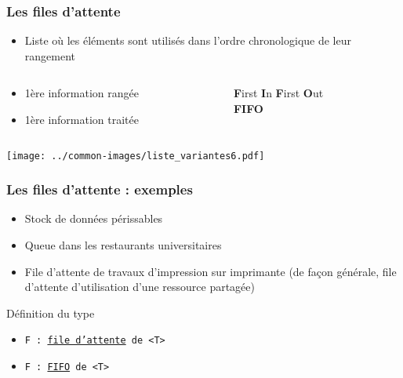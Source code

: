\documentclass[table,handout,tikz,12pt,svgnames]{beamer}
\begin{document}
\begin{frame}[fragile=singleslide]
	\frametitle{Les files d'attente}
	\begin{block}{}
		\begin{itemize}
			\item  Liste où les éléments sont utilisés dans l'ordre chronologique de leur rangement
		\end{itemize}
	\end{block}
		\begin{columns}[c]
			\hspace{-0.5cm}
			\begin{column}{0.7\textwidth}
				\begin{itemize}
					\item 1ère information rangée
					\item 1ère information traitée
				\end{itemize}
			\end{column}
			\hspace{-1.3cm}
			\vrule{}
			\hspace{0.3cm}
			\begin{column}{0.38\textwidth}
				\begin{center}
					\textbf{F}irst \textbf{I}n \textbf{F}irst \textbf{O}ut\\ \textbf{FIFO}
				\end{center}
			\end{column}
		\end{columns}	
		\begin{center}
			\hspace{-0.83cm}
			{\texttt{[image: ../common-images/liste\_variantes6.pdf]}}
		\end{center}
\end{frame}


\begin{frame}[fragile=singleslide]
	\frametitle{Les files d'attente : exemples}
	\begin{block}{}
		\begin{itemize}
			\item Stock de données périssables
			\item Queue dans les restaurants universitaires
            \item File d'attente de travaux d'impression sur imprimante (de façon générale, file d'attente d'utilisation d'une ressource partagée)
		\end{itemize}
	\end{block}
	\begin{block}{Définition du type}
		\begin{itemize}
			\item \texttt{F : \underline{file d'attente} de <T>}
			\item \texttt{F : \underline{FIFO} de <T>}
		\end{itemize}
	\end{block}
\end{frame}
\end{document}
